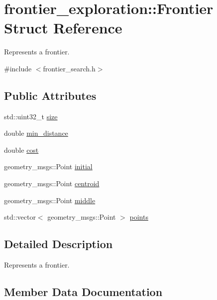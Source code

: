 \hypertarget{structfrontier__exploration_1_1Frontier}{}\section{frontier\+\_\+exploration\+:\+:Frontier Struct Reference}
\label{structfrontier__exploration_1_1Frontier}


Represents a frontier.  




{\ttfamily \#include $<$frontier\+\_\+search.\+h$>$}

\subsection*{Public Attributes}
\begin{DoxyCompactItemize}
\item 
std\+::uint32\+\_\+t \hyperlink{structfrontier__exploration_1_1Frontier_ab850ad2ae90bf0308cba48ad9d8dec4c}{size}
\item 
double \hyperlink{structfrontier__exploration_1_1Frontier_a9d55b8e1c1276ad52d303e350eb01b36}{min\+\_\+distance}
\item 
double \hyperlink{structfrontier__exploration_1_1Frontier_a83107d241973d2a9ed3e182d590e7e56}{cost}
\item 
geometry\+\_\+msgs\+::\+Point \hyperlink{structfrontier__exploration_1_1Frontier_a21da5044337952793443ac74b2fdf1cb}{initial}
\item 
geometry\+\_\+msgs\+::\+Point \hyperlink{structfrontier__exploration_1_1Frontier_a45d35b7dc180ce9382630d9348f722db}{centroid}
\item 
geometry\+\_\+msgs\+::\+Point \hyperlink{structfrontier__exploration_1_1Frontier_a76f982fcee65872b354225b95f00ee5b}{middle}
\item 
std\+::vector$<$ geometry\+\_\+msgs\+::\+Point $>$ \hyperlink{structfrontier__exploration_1_1Frontier_ad124fa5a17e45fedd9e9b00d34182ea3}{points}
\end{DoxyCompactItemize}


\subsection{Detailed Description}
Represents a frontier. 

\subsection{Member Data Documentation}
